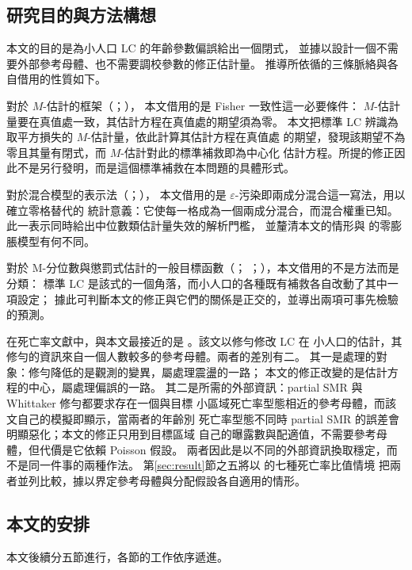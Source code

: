 \documentclass[UTF8, fontset=macnew, a4paper, 12pt]{ctexart}
\begin{document}
\subsection{研究目的與方法構想}

本文的目的是為小人口 LC 的年齡參數偏誤給出一個閉式，
並據以設計一個不需要外部參考母體、也不需要調校參數的修正估計量。
推導所依循的三條脈絡與各自借用的性質如下。

對於 $M$-估計的框架（\citealp{huber1964}；\citealp{huber2009}），
本文借用的是 Fisher 一致性這一必要條件：
$M$-估計量要在真值處一致，其估計方程在真值處的期望須為零。
本文把標準 LC 辨識為取平方損失的 $M$-估計量，依此計算其估計方程在真值處
的期望，發現該期望不為零且其量有閉式，而 $M$-估計對此的標準補救即為中心化
估計方程。所提的修正因此不是另行發明，而是這個標準補救在本問題的具體形式。

對於混合模型的表示法（\citealp{mclachlan2000}；\citealp{yao2024}），
本文借用的是 $\varepsilon$-污染即兩成分混合這一寫法，用以確立零格替代的
統計意義：它使每一格成為一個兩成分混合，而混合權重已知。
此一表示同時給出中位數類估計量失效的解析門檻，
並釐清本文的情形與 \citet{lambert1992} 的零膨脹模型有何不同。

對於 M-分位數與懲罰式估計的一般目標函數（\citealp{breckling1988}；
\citealp{zoubir2018}；\citealp{ranalli2023}），本文借用的不是方法而是分類：
標準 LC 是該式的一個角落，而小人口的各種既有補救各自改動了其中一項設定；
據此可判斷本文的修正與它們的關係是正交的，並導出兩項可事先檢驗的預測。

在死亡率文獻中，與本文最接近的是 \citet{yue2019}。該文以修勻修改 LC 在
小人口的估計，其修勻的資訊來自一個人數較多的參考母體。兩者的差別有二。
其一是處理的對象：修勻降低的是觀測的變異，屬處理震盪的一路；
本文的修正改變的是估計方程的中心，屬處理偏誤的一路。
其二是所需的外部資訊：partial SMR 與 Whittaker 修勻都要求存在一個與目標
小區域死亡率型態相近的參考母體，而該文自己的模擬即顯示，當兩者的年齡別
死亡率型態不同時 partial SMR 的誤差會明顯惡化；本文的修正只用到目標區域
自己的曝露數與配適值，不需要參考母體，但代價是它依賴 Poisson 假設。
兩者因此是以不同的外部資訊換取穩定，而不是同一件事的兩種作法。
第\ref{sec:result}節之五將以 \citet[Figure 2]{yue2019} 的七種死亡率比值情境
把兩者並列比較，據以界定參考母體與分配假設各自適用的情形。

\subsection{本文的安排}\label{sec:roadmap}

本文後續分五節進行，各節的工作依序遞進。
\end{document}

